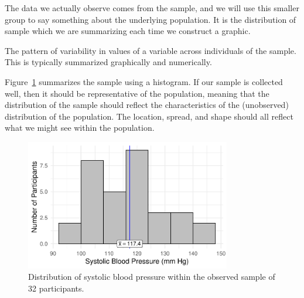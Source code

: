 \documentclass[
  letterpaper,
  DIV=11,
  numbers=noendperiod]{scrreprt}
\theoremstyle{definition}
\theoremstyle{definition}
\theoremstyle{remark}
\begin{document}
The data we actually observe comes from the sample, and we will use this
smaller group to say something about the underlying population. It is
the distribution of sample which we are summarizing each time we
construct a graphic.

\begin{tcolorbox}[enhanced jigsaw, left=2mm, toprule=.15mm, arc=.35mm, breakable, opacitybacktitle=0.6, opacityback=0, rightrule=.15mm, colbacktitle=quarto-callout-important-color!10!white, coltitle=black, leftrule=.75mm, toptitle=1mm, colframe=quarto-callout-important-color-frame, titlerule=0mm, title=\textcolor{quarto-callout-important-color}{\faExclamation}\hspace{0.5em}{Distribution of the Sample}, bottomrule=.15mm, colback=white, bottomtitle=1mm]

The pattern of variability in values of a variable across individuals of
the sample. This is typically summarized graphically and numerically.

\end{tcolorbox}

Figure~\ref{fig-distributional-quartet-sample} summarizes the sample
using a histogram. If our sample is collected well, then it should be
representative of the population, meaning that the distribution of the
sample should reflect the characteristics of the (unobserved)
distribution of the population. The location, spread, and shape should
all reflect what we might see within the population.

\begin{figure}

{\centering \includegraphics[width=0.8\textwidth,height=\textheight]{./images/fig-distributional-quartet-sample-1.pdf}

}

\caption{\label{fig-distributional-quartet-sample}Distribution of
systolic blood pressure within the observed sample of 32 participants.}

\end{figure}
\end{document}
